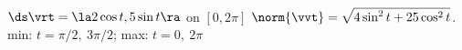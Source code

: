 {$\ds \vrt = \la 2\cos t,5\sin t \ra$ on $[0,2\pi]$
}
{
$\norm{\vvt} = \sqrt{4\sin^2t+25\cos^2t}$. \\
min: $t=\pi/2,\ 3\pi/2$; max: $t=0,\ 2\pi$
}
